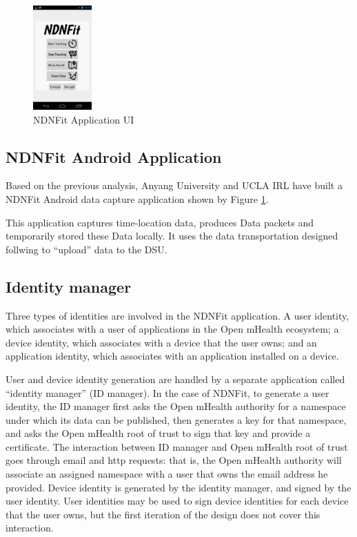 \documentclass{article}
\begin{document}
\begin{figure}
	\begin{center}
		\includegraphics[width=0.2\textwidth]{NDNFit.png}
		\caption{NDNFit Application UI}
		\label{fig:ndnfit}
	\end{center}
\end{figure}

\subsection{NDNFit Android Application}
Based on the previous analysis, Anyang University and UCLA IRL have built a  NDNFit Android data capture application shown by Figure \ref{fig:ndnfit}.

This application captures time-location data, produces Data packets and temporarily stored these Data locally. It uses the data transportation designed follwing to ``upload'' data to the DSU.

\subsection{Identity manager}

Three types of identities are involved in the NDNFit application. A user identity, which associates with a user of applications in the Open mHealth ecosystem; a device identity, which associates with a device that the user owns; and an application identity, which associates with an application installed on a device.

User and device identity generation are handled by a separate application called ``identity manager'' (ID manager). In the case of NDNFit, to generate a user identity, the ID manager first asks the Open mHealth authority for a namespace under which its data can be published, then generates a key for that namespace, and asks the Open mHealth root of trust to sign that key and provide a certificate. The interaction between ID manager and Open mHealth root of trust goes through email and http requests: that is, the Open mHealth authority will associate an assigned namespace with a user that owns the email address he provided. Device identity is generated by the identity manager, and signed by the user identity. User identities may be used to sign device identities for each device that the user owns, but the first iteration of the design does not cover this interaction.
\end{document}
